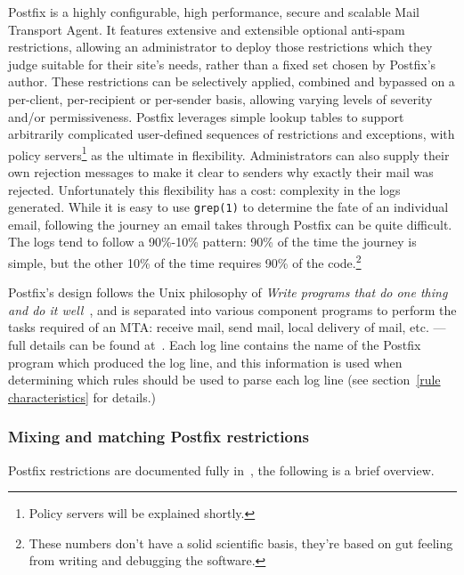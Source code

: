\documentclass[a4paper,12pt,draft]{article}
\begin{document}
Postfix is a highly configurable, high performance, secure and scalable
Mail Transport Agent.  It features extensive and extensible optional
anti-spam restrictions, allowing an administrator to deploy those
restrictions which they judge suitable for their site's needs, rather than
a fixed set chosen by Postfix's author.  These restrictions can be
selectively applied, combined and bypassed on a per-client, per-recipient
or per-sender basis, allowing varying levels of severity and/or
permissiveness.  Postfix leverages simple lookup tables to support
arbitrarily complicated user-defined sequences of restrictions and
exceptions, with policy servers\footnote{Policy servers will be explained
shortly.} as the ultimate in flexibility.  Administrators can also supply
their own rejection messages to make it clear to senders why exactly their
mail was rejected.  Unfortunately this flexibility has a cost: complexity
in the logs generated.  While it is easy to use \texttt{grep(1)} to
determine the fate of an individual email, following the journey an email
takes through Postfix can be quite difficult.  The logs tend to follow a
90\%-10\% pattern: 90\% of the time the journey is simple, but the other
10\% of the time requires 90\% of the code.\footnote{These numbers don't
have a solid scientific basis, they're based on gut feeling from writing
and debugging the software.}

Postfix's design follows the Unix philosophy of \textit{Write programs that
do one thing and do it well\/}~\cite{unix-philosophy}, and is separated
into various component programs to perform the tasks required of an MTA\@:
receive mail, send mail, local delivery of mail, etc. --- full details can
be found at~\cite{postfix-overview}.  Each log line contains the name of
the Postfix program which produced the log line, and this information is
used when determining which rules should be used to parse each log line
(see section~\ref{rule characteristics} for details.)

\subsubsection{Mixing and matching Postfix restrictions}

Postfix restrictions are documented fully in~\cite{smtpd_access_readme,
smtpd_per_user_control, policy-servers}, the following is a brief overview.
\end{document}
